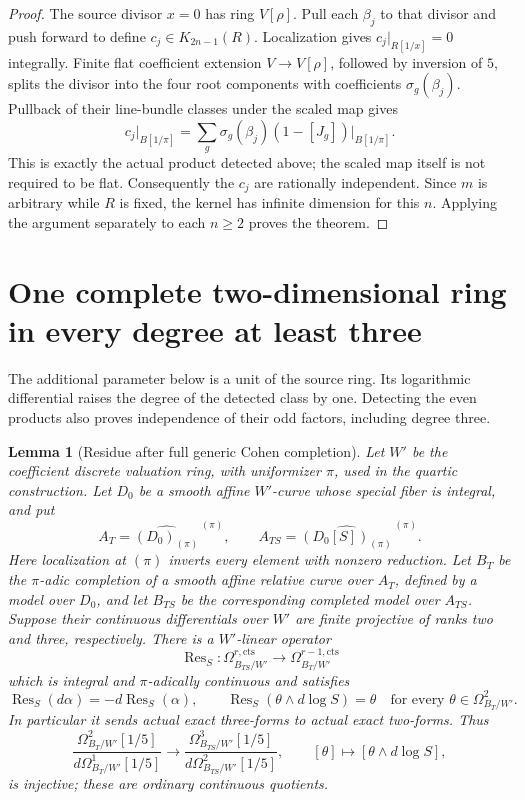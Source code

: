 \documentclass[11pt,a4paper]{article}
\newtheorem{lemma}[theorem]{Lemma}
\theoremstyle{remark}
\begin{document}
\begin{proof}
The source divisor $x=0$ has ring $V[\rho]$.
Pull each $\beta_j$ to that divisor and push forward to define
$c_j\in K_{2n-1}(R)$.  Localization gives $c_j|_{R[1/x]}=0$
integrally.  Finite flat coefficient extension $V\to V[\rho]$,
followed by inversion of $5$, splits the divisor into the four
root components with coefficients $\sigma_g(\beta_j)$.
Pullback of their line-bundle classes under the scaled map gives
\[
 c_j|_{B[1/\pi]}
   =\sum_g\sigma_g(\beta_j)(1-[J_g])\big|_{B[1/\pi]}.
\]
This is exactly the actual product detected above; the scaled map
itself is not required to be flat.
Consequently the $c_j$ are rationally independent.
Since $m$ is arbitrary while $R$ is fixed, the kernel has infinite
dimension for this $n$.  Applying the argument separately to each
$n\geq2$ proves the theorem.
\end{proof}


\section{One complete two-dimensional ring in every degree at least three}
\label{sec:dimtwoAllDegreesFixedRing}

The additional parameter below is a unit of the source ring.
Its logarithmic differential raises the degree of the detected
class by one.  Detecting the even products also proves independence
of their odd factors, including degree three.

\begin{lemma}[Residue after full generic Cohen completion]
\label{lem:dimtwoFullCohenLaurentResidue}
Let $W'$ be the coefficient discrete valuation ring, with
uniformizer $\pi$, used in the quartic construction.  Let $D_0$
be a smooth affine $W'$-curve whose special fiber is integral,
and put
\[
 A_T=\widehat{(D_0)_{(\pi)}}^{\,(\pi)},\qquad
 A_{TS}=\widehat{(D_0[S])_{(\pi)}}^{\,(\pi)}.
\]
Here localization at $(\pi)$ inverts every element with nonzero
reduction.  Let $B_T$ be the $\pi$-adic completion of a smooth
affine relative curve over $A_T$, defined by a model over $D_0$,
and let $B_{TS}$ be the corresponding completed model over
$A_{TS}$.  Suppose their continuous differentials over $W'$
are finite projective of ranks two and three, respectively.
There is a $W'$-linear operator
\[
 \operatorname{Res}_S:
 \Omega^{r,\mathrm{cts}}_{B_{TS}/W'}
       \longrightarrow \Omega^{r-1,\mathrm{cts}}_{B_T/W'}
\]
which is integral and $\pi$-adically continuous and satisfies
\[
 \operatorname{Res}_S(d\alpha)=-d\operatorname{Res}_S(\alpha),
 \qquad
 \operatorname{Res}_S(\theta\wedge d\log S)=\theta
       \quad\text{for every }\theta\in\Omega^2_{B_T/W'}.
\]
In particular it sends actual exact three-forms to actual exact
two-forms.  Thus
\[
 \frac{\Omega^2_{B_T/W'}[1/5]}
      {d\Omega^1_{B_T/W'}[1/5]}
 \longrightarrow
 \frac{\Omega^3_{B_{TS}/W'}[1/5]}
      {d\Omega^2_{B_{TS}/W'}[1/5]},
 \qquad [\theta]\longmapsto[\theta\wedge d\log S],
\]
is injective; these are ordinary continuous quotients.
\end{lemma}
\end{document}
